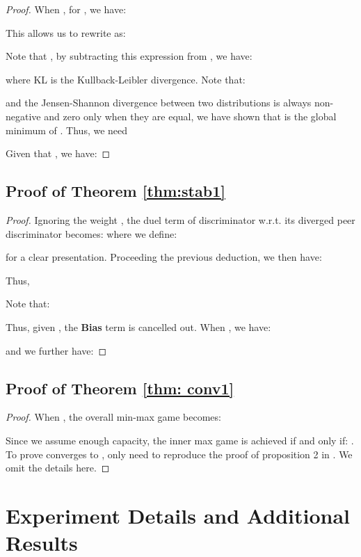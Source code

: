 \begin{proof}
When , for , we have:

This allows us to rewrite  as:


Note that , by subtracting this expression from , we have:

where KL is the Kullback-Leibler divergence. Note that:

and the Jensen-Shannon divergence between two distributions is always non-negative and zero only when they are equal, we have shown that  is the global minimum of . Thus, we need 

Given that , we have:



\end{proof}

\subsection{Proof of Theorem \ref{thm:stab1}}
\begin{proof}
Ignoring the weight , the duel term of discriminator  w.r.t. its diverged peer discriminator  becomes:
{}
where we define: 

for a clear presentation. Proceeding the previous deduction, we then have:

Thus, 

Note that:

Thus, given , the \textbf{Bias} term is cancelled out. When , we have:

and we further have:


\end{proof}

\subsection{Proof of Theorem \ref{thm: conv1}}
\begin{proof}
When , the overall min-max game becomes:

Since we assume enough capacity, the inner max game is achieved if and only if:
. To prove  converges to , only need to reproduce the proof of proposition 2 in \cite{gan}. We omit the details here.

\end{proof}




\section{Experiment Details and Additional Results}\label{app:exp}
